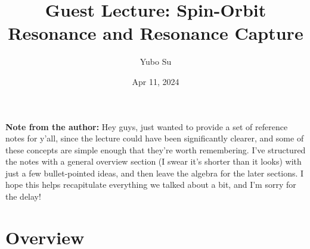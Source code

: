 \documentclass[11pt,
        usenames, %
        dvipsnames %
    ]{article}
\begin{document}
\pagestyle{fancy}
\rhead{}
\cfoot{\thepage/\pageref{LastPage}}

\title{Guest Lecture: Spin-Orbit Resonance and Resonance Capture}
\author{Yubo Su}
\date{Apr 11, 2024}

\maketitle

\textbf{Note from the author:} Hey guys, just wanted to provide a set of
reference notes for y'all, since the lecture could have been significantly
clearer, and some of these concepts are simple enough that they're worth
remembering. I've structured the notes with a general overview section (I swear
it's shorter than it looks) with just a few bullet-pointed ideas, and then
leave the algebra for the later sections. I hope this helps recapitulate
everything we talked about a bit, and I'm sorry for the delay!

\section{Overview}
\end{document}
